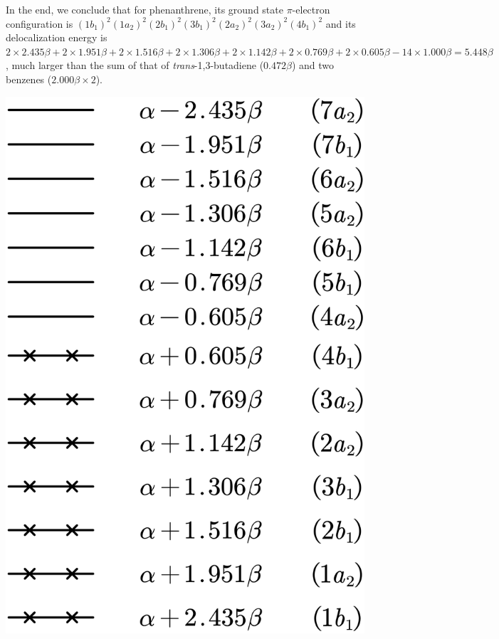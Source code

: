 		In the end, we conclude that for phenanthrene, its ground state $\pi$-electron configuration is $(1b_1)^2 (1a_2)^2 (2b_1)^2 (3b_1)^2 (2a_2)^2 (3a_2)^2 (4b_1)^2$ and its delocalization energy is $2 \times 2.435 \beta + 2 \times 1.951 \beta + 2 \times 1.516 \beta + 2 \times 1.306 \beta + 2 \times 1.142 \beta + 2 \times 0.769 \beta + 2 \times 0.605 \beta - 14 \times 1.000 \beta = 5.448 \beta$, much larger than the sum of that of {\it trans}-1,3-butadiene ($0.472\beta$) and two benzenes ($2.000\beta \times 2$). 
		
		\begin{center}
		\includegraphics[scale=1.0]{./structures/exercise_1/phenanthrene/998.png}
		\end{center}